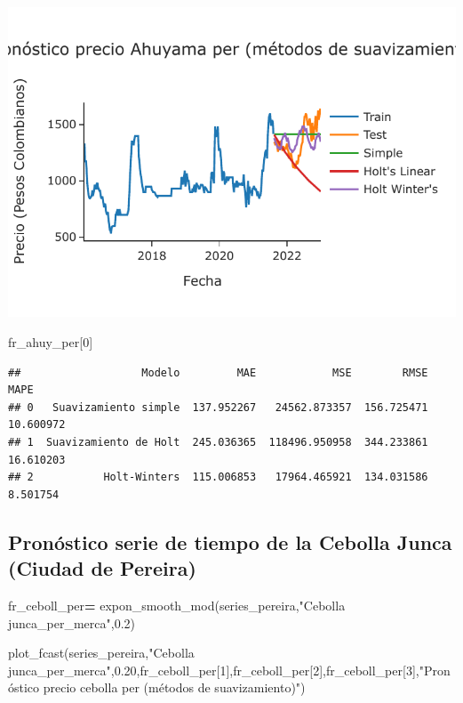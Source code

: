 \documentclass[
]{book}
\newenvironment{Shaded}{\begin{snugshade}}{\end{snugshade}}
\newcommand{\DecValTok}[1]{\textcolor[rgb]{0.00,0.00,0.81}{#1}}
\newcommand{\FloatTok}[1]{\textcolor[rgb]{0.00,0.00,0.81}{#1}}
\newcommand{\NormalTok}[1]{#1}
\newcommand{\OperatorTok}[1]{\textcolor[rgb]{0.81,0.36,0.00}{\textbf{#1}}}
\newcommand{\StringTok}[1]{\textcolor[rgb]{0.31,0.60,0.02}{#1}}
\begin{document}
\includegraphics{bookdown-demo_files/figure-latex/unnamed-chunk-140-127.pdf}

\begin{Shaded}
\begin{Highlighting}[]

\NormalTok{fr\_ahuy\_per[}\DecValTok{0}\NormalTok{]}
\end{Highlighting}
\end{Shaded}

\begin{verbatim}
##                   Modelo         MAE            MSE        RMSE       MAPE
## 0   Suavizamiento simple  137.952267   24562.873357  156.725471  10.600972
## 1  Suavizamiento de Holt  245.036365  118496.950958  344.233861  16.610203
## 2           Holt-Winters  115.006853   17964.465921  134.031586   8.501754
\end{verbatim}

\hypertarget{pronuxf3stico-serie-de-tiempo-de-la-cebolla-junca-ciudad-de-pereira}{%
\subsection{Pronóstico serie de tiempo de la Cebolla Junca (Ciudad de Pereira)}\label{pronuxf3stico-serie-de-tiempo-de-la-cebolla-junca-ciudad-de-pereira}}

\begin{Shaded}
\begin{Highlighting}[]

\NormalTok{fr\_ceboll\_per}\OperatorTok{=}\NormalTok{ expon\_smooth\_mod(series\_pereira,}\StringTok{"Cebolla junca\_per\_merca"}\NormalTok{,}\FloatTok{0.2}\NormalTok{)}

\NormalTok{plot\_fcast(series\_pereira,}\StringTok{"Cebolla junca\_per\_merca"}\NormalTok{,}\FloatTok{0.20}\NormalTok{,fr\_ceboll\_per[}\DecValTok{1}\NormalTok{],fr\_ceboll\_per[}\DecValTok{2}\NormalTok{],fr\_ceboll\_per[}\DecValTok{3}\NormalTok{],}\StringTok{"Pronóstico precio cebolla per (métodos de suavizamiento)"}\NormalTok{)}
\end{Highlighting}
\end{Shaded}
\end{document}

